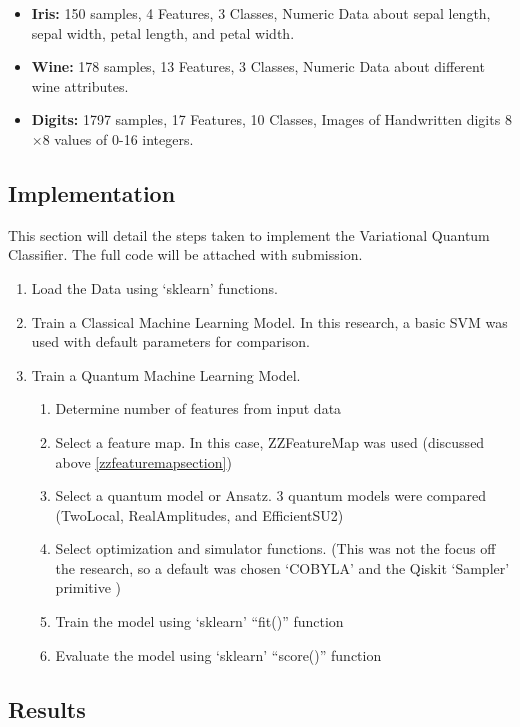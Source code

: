 \documentclass[11pt]{article}
\begin{document}
\begin{itemize}
    \item \textbf{Iris:} 150 samples, 4 Features, 3 Classes, Numeric Data about sepal length, sepal width, petal length, and petal width.
    \item \textbf{Wine:} 178 samples, 13 Features, 3 Classes, Numeric Data about different wine attributes.
    \item \textbf{Digits:} 1797 samples, 17 Features, 10 Classes, Images of Handwritten digits 8$\times$8 values of 0-16 integers.
\end{itemize}

\subsection*{Implementation}
This section will detail the steps taken to implement the Variational Quantum Classifier. The full code will be attached with submission.

\begin{enumerate}
    \item Load the Data using `sklearn' functions.
    \item Train a Classical Machine Learning Model. In this research, a basic SVM was used with default parameters for comparison.
    \item Train a Quantum Machine Learning Model. 
    \begin{enumerate}
        \item Determine number of features from input data
        \item Select a feature map. In this case, ZZFeatureMap was used (discussed above \ref{zzfeaturemapsection})
        \item Select a quantum model or Ansatz. 3 quantum models were compared (TwoLocal, RealAmplitudes, and EfficientSU2)
        \item Select optimization and simulator functions. (This was not the focus off the research, so a default was chosen `COBYLA' and the Qiskit `Sampler' primitive )
        \item Train the model using `sklearn' ``fit()'' function 
        \item Evaluate the model using `sklearn' ``score()'' function 
    \end{enumerate}
\end{enumerate}

\subsection*{Results}
\end{document}
